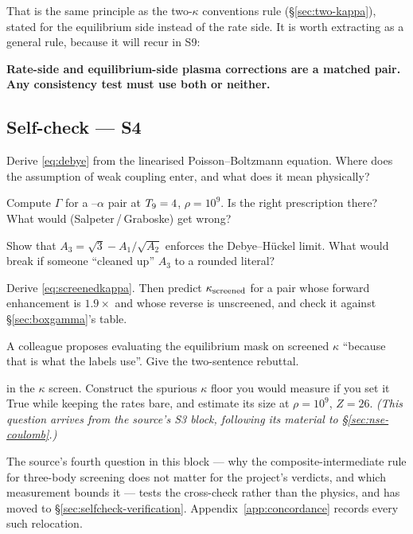 That is the same principle as the two-$\kappa$ conventions rule
(\S\ref{sec:two-kappa}), stated for the equilibrium side instead of the rate
side. It is worth extracting as a general rule, because it will recur in S9:

\begin{invariant}
\textbf{Rate-side and equilibrium-side plasma corrections are a matched pair.
Any consistency test must use both or neither.}
\end{invariant}

\subsection*{Self-check --- S4}
\label{sec:selfcheck-plasma}

\begin{selfcheck}
\item Derive \eqref{eq:debye} from the linearised Poisson--Boltzmann equation.
      Where does the assumption of weak coupling enter, and what does it mean
      physically?
\item Compute $\Gamma$ for a --$\alpha$ pair at $T_{9} = 4$,
      $\rho = 10^9$. Is  the right prescription there? What
      would  (Salpeter\,/\,Graboske) get wrong?
\item Show that $A_3 = \sqrt3 - A_1/\sqrt{A_2}$ enforces the Debye--H\"uckel
      limit. What would break if someone ``cleaned up'' $A_3$ to a rounded
      literal?
\item Derive \eqref{eq:screenedkappa}. Then predict $\kappa_{\rm screened}$ for
      a pair whose forward enhancement is $1.9\times$ and whose reverse is
      unscreened, and check it against \S\ref{sec:boxgamma}'s table.
\item A colleague proposes evaluating the equilibrium mask on screened $\kappa$
      ``because that is what the labels use''. Give the two-sentence rebuttal.
\item {} in the $\kappa$ screen. Construct the
      spurious $\kappa$ floor you would measure if you set it True while keeping
      the rates bare, and estimate its size at $\rho = 10^9$, $Z = 26$.
      \emph{(This question arrives from the source's S3 block, following its
      material to \S\ref{sec:nse-coulomb}.)}
\end{selfcheck}

\begin{aside}
The source's fourth question in this block --- why the composite-intermediate
rule for three-body screening does not matter for the project's verdicts, and
which measurement bounds it --- tests the cross-check rather than the physics,
and has moved to \S\ref{sec:selfcheck-verification}.
Appendix~\ref{app:concordance} records every such relocation.
\end{aside}
